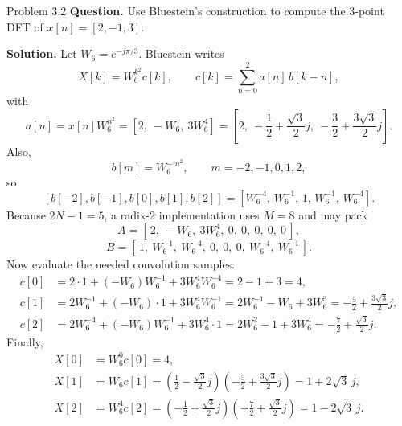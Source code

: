 \documentclass[10pt]{article}
\newcommand{\Prompt}[1]{\textbf{Question.} #1}
\newcommand{\SketchLabel}{\tcblower\textbf{Solution.}}
\begin{document}
\begin{examplebox}{Problem 3.2}
  \Prompt{Use Bluestein's construction to compute the 3-point DFT of \(x[n]=[2,-1,3]\).}

  \medskip
  \SketchLabel{}
  Let \(W_6=e^{-j\pi/3}\). Bluestein writes
  \[
    X[k]=W_6^{k^2}c[k],\qquad
    c[k]=\sum_{n=0}^{2}a[n]\,b[k-n],
  \]
  with
  \[
    a[n]=x[n]W_6^{n^2}=[2,\ -W_6,\ 3W_6^4]
    =\left[2,\ -\frac12+\frac{\sqrt3}{2}j,\ -\frac32+\frac{3\sqrt3}{2}j\right].
  \]
  Also,
  \[
    b[m]=W_6^{-m^2},\qquad m=-2,-1,0,1,2,
  \]
  so
  \[
    [b[-2],b[-1],b[0],b[1],b[2]]
    =[W_6^{-4},\,W_6^{-1},\,1,\,W_6^{-1},\,W_6^{-4}].
  \]
  Because \(2N-1=5\), a radix-2 implementation uses \(M=8\) and may pack
  \[
    A=[\,2,\ -W_6,\ 3W_6^4,\ 0,\ 0,\ 0,\ 0,\ 0\,],
  \]
  \[
    B=[\,1,\ W_6^{-1},\ W_6^{-4},\ 0,\ 0,\ 0,\ W_6^{-4},\ W_6^{-1}\,].
  \]
  Now evaluate the needed convolution samples:
  \[
    \begin{aligned}
      c[0]&=2\cdot 1+(-W_6)W_6^{-1}+3W_6^4W_6^{-4}=2-1+3=4,\\
      c[1]&=2W_6^{-1}+(-W_6)\cdot 1+3W_6^4W_6^{-1}
      =2W_6^{-1}-W_6+3W_6^3
      =-\frac52+\frac{3\sqrt3}{2}j,\\
      c[2]&=2W_6^{-4}+(-W_6)W_6^{-1}+3W_6^4\cdot 1
      =2W_6^2-1+3W_6^4
      =-\frac72+\frac{\sqrt3}{2}j.
    \end{aligned}
  \]
  Finally,
  \[
    \begin{aligned}
      X[0]&=W_6^0c[0]=4,\\
      X[1]&=W_6c[1]
      =\left(\frac12-\frac{\sqrt3}{2}j\right)\left(-\frac52+\frac{3\sqrt3}{2}j\right)
      =1+2\sqrt3\,j,\\
      X[2]&=W_6^4c[2]
      =\left(-\frac12+\frac{\sqrt3}{2}j\right)\left(-\frac72+\frac{\sqrt3}{2}j\right)
      =1-2\sqrt3\,j.
    \end{aligned}
  \]

\end{examplebox}
\end{document}
